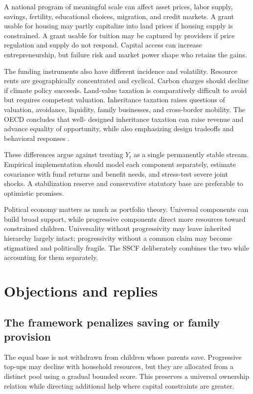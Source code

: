 \documentclass[11pt]{article}
\begin{document}
A national program of meaningful scale can affect asset prices, labor supply, savings,
fertility, educational choices, migration, and credit markets. A grant usable for
housing may partly capitalize into land prices if housing supply is constrained. A
grant usable for tuition may be captured by providers if price regulation and supply do
not respond. Capital access can increase entrepreneurship, but failure risk and market
power shape who retains the gains.

The funding instruments also have different incidence and volatility. Resource rents
are geographically concentrated and cyclical. Carbon charges should decline if climate
policy succeeds. Land-value taxation is comparatively difficult to avoid but requires
competent valuation. Inheritance taxation raises questions of valuation, avoidance,
liquidity, family businesses, and cross-border mobility. The OECD concludes that well-
designed inheritance taxation can raise revenue and advance equality of opportunity,
while also emphasizing design tradeoffs and behavioral responses \cite{oecd2021}.

These differences argue against treating $Y_t$ as a single permanently stable stream.
Empirical implementation should model each component separately, estimate covariance
with fund returns and benefit needs, and stress-test severe joint shocks. A stabilization
reserve and conservative statutory base are preferable to optimistic promises.

Political economy matters as much as portfolio theory. Universal components can build
broad support, while progressive components direct more resources toward constrained
children. Universality without progressivity may leave inherited hierarchy largely
intact; progressivity without a common claim may become stigmatized and politically
fragile. The SSCF deliberately combines the two while accounting for them separately.

\section{Objections and replies}

\subsection{The framework penalizes saving or family provision}

The equal base is not withdrawn from children whose parents save. Progressive top-ups
may decline with household resources, but they are allocated from a distinct pool using
a gradual bounded score. This preserves a universal ownership relation while directing
additional help where capital constraints are greater.
\end{document}
